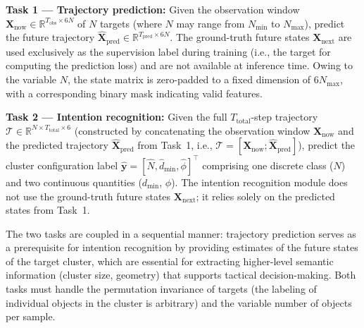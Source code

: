 \documentclass[a4paper,fleqn]{cas-dc}
\begin{document}
\textbf{Task 1 --- Trajectory prediction:} Given the observation window $\bm{X}_{\text{now}} \in \mathbb{R}^{T_{\text{obs}} \times 6N}$ of $N$ targets (where $N$ may range from $N_{\min}$ to $N_{\max}$), predict the future trajectory $\hat{\bm{X}}_{\text{pred}} \in \mathbb{R}^{T_{\text{pred}} \times 6N}$. The ground-truth future states $\bm{X}_{\text{next}}$ are used exclusively as the supervision label during training (i.e., the target for computing the prediction loss) and are not available at inference time. Owing to the variable $N$, the state matrix is zero-padded to a fixed dimension of $6N_{\max}$, with a corresponding binary mask indicating valid features.

\textbf{Task 2 --- Intention recognition:} Given the full $T_{\text{total}}$-step trajectory $\mathcal{T} \in \mathbb{R}^{N \times T_{\text{total}} \times 6}$ (constructed by concatenating the observation window $\bm{X}_{\text{now}}$ and the predicted trajectory $\hat{\bm{X}}_{\text{pred}}$ from Task~1, i.e., $\mathcal{T} = [\bm{X}_{\text{now}}; \hat{\bm{X}}_{\text{pred}}]$), predict the cluster configuration label $\hat{\bm{y}} = [\hat{N}, \hat{d}_{\min}, \hat{\phi}]^\top$ comprising one discrete class ($N$) and two continuous quantities ($d_{\min}$, $\phi$). The intention recognition module does not use the ground-truth future states $\bm{X}_{\text{next}}$; it relies solely on the predicted states from Task~1.

The two tasks are coupled in a sequential manner: trajectory prediction serves as a prerequisite for intention recognition by providing estimates of the future states of the target cluster, which are essential for extracting higher-level semantic information (cluster size, geometry) that supports tactical decision-making. Both tasks must handle the permutation invariance of targets (the labeling of individual objects in the cluster is arbitrary) and the variable number of objects per sample.
\end{document}
